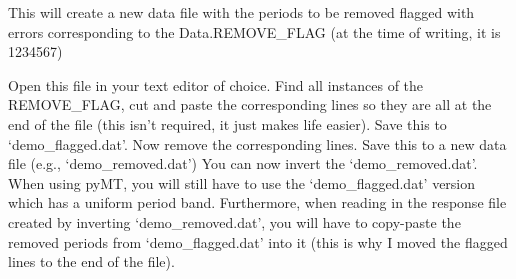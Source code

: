 \documentclass[letterpaper,10pt,english]{sphinxmanual}
\begin{document}
\begin{sphinxVerbatim}[commandchars=\\\{\}]
    
     
           
                     
                        \PYG{p}{[}\PYG{p}{]}\PYG{p}{[}\PYG{p}{]}\PYG{p}{[}\PYG{p}{]}    
         
                   
                        \PYG{p}{[}\PYG{p}{]}\PYG{p}{[}\PYG{p}{]}\PYG{p}{[}\PYG{p}{]}    
  
\end{sphinxVerbatim}

This will create a new data file with the periods to be removed flagged with errors corresponding to the Data.REMOVE\_FLAG (at the time of writing, it is 1234567)

Open this file in your text editor of choice. Find all instances of the REMOVE\_FLAG, cut and paste the corresponding lines so they are all at the end of the file (this isn’t required, it just makes life easier). Save this to ‘demo\_flagged.dat’. Now remove the corresponding lines. Save this to a new data file (e.g., ‘demo\_removed.dat’)
You can now invert the ‘demo\_removed.dat’. When using pyMT, you will still have to use the ‘demo\_flagged.dat’ version which has a uniform period band. Furthermore, when reading in the response file created by inverting ‘demo\_removed.dat’, you will have to copy-paste the removed periods from ‘demo\_flagged.dat’ into it (this is why I moved the flagged lines to the end of the file).
\end{document}
